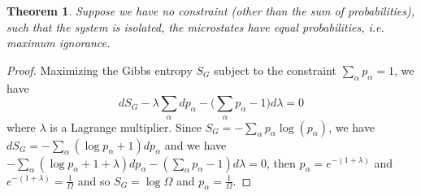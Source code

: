 \documentclass[a4paper]{article}
\theoremstyle{new}
\newtheorem{thm}{Theorem}[section]
\begin{document}
\begin{thm}
Suppose we have no constraint (other than the sum of probabilities), such that the system is isolated, the microstates have equal probabilities, i.e. maximum ignorance. 
\end{thm}
\begin{proof}
Maximizing the Gibbs entropy $S_G$ subject to the constraint $\sum_\alpha p_\alpha=1$, we have
$$dS_G-\lambda\sum_\alpha dp_\alpha-\bigg(\sum_\alpha p_\alpha-1\bigg)d\lambda=0$$
where $\lambda$ is a Lagrange multiplier. Since $S_G=-\sum_\alpha p_\alpha\log(p_\alpha)$, we have $dS_G=-\sum_\alpha(\log p_\alpha+1)dp_\alpha$ and we have $-\sum_\alpha(\log p_\alpha+1+\lambda)dp_\alpha-(\sum_\alpha p_\alpha-1)d\lambda=0$, then $p_\alpha=e^{-(1+\lambda)}$ and $e^{-(1+\lambda)}=\frac{1}{\Omega}$ and so $S_G=\log\Omega$ and $p_\alpha=\frac{1}{\Omega}$.
\end{proof}
\end{document}
